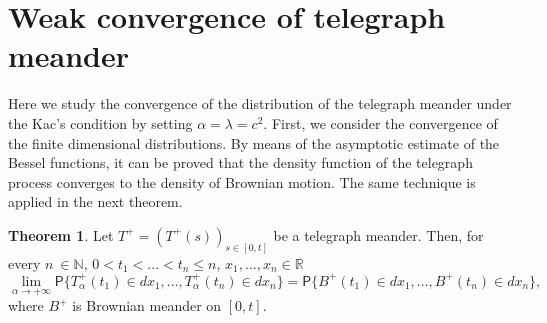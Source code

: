 \documentclass{article}
\theoremstyle{definition}
\newtheorem{theorem}{Theorem}[section]
\numberwithin{equation}{section}
\begin{document}
\section{Weak convergence of telegraph meander}
Here we study the convergence of the distribution of the telegraph meander under the Kac's condition by setting $\alpha= \lambda =c^2$. First, we consider the convergence of the finite dimensional distributions. By means of the asymptotic estimate of the Bessel functions, it can be proved that the density function of the telegraph process converges to the density of Brownian motion. The same technique is applied in the next theorem.
\begin{theorem}
Let $T^+ = (T^+(s))_{s \in [0,t]}$ be a telegraph meander. Then, for every $n\ \in\mathbb{N}$, $0<t_1<...<t_n\leq n$, $x_1,...,x_n \in \mathbb{R}$
\begin{equation}
\lim_{\alpha \to +\infty}\mathsf{P}\{T^+_{\alpha}(t_1) \in dx_1,...,T^+_{\alpha}(t_n) \in dx_n\} = \mathsf{P}\{B^+(t_1) \in dx_1,...,B^{+}(t_n) \in dx_n\},
\end{equation}
where $B^+$ is Brownian meander on $[0,t]$.
\end{theorem}
\end{document}
